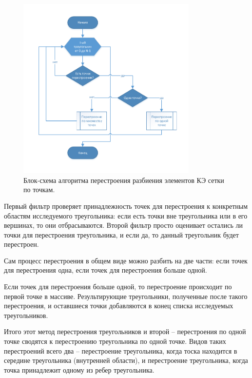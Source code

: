 \documentclass[
11pt,%
tightenlines,%
twoside,%
onecolumn,%
nofloats,%
nobibnotes,%
nofootinbib,%
superscriptaddress,%
noshowpacs,%
centertags]%
{revtex4}
\begin{document}
\begin{figure}[h]
\includegraphics[width=0.8\textwidth]{pics/pic_6.pdf}
\caption{Блок-схема алгоритма перестроения разбиения элементов КЭ сетки по точкам.}\label{fig:6}
\end{figure}

Первый фильтр проверяет принадлежность точек для перестроения к конкретным областям исследуемого треугольника: если есть точки вне треугольника или в его вершинах, то они отбрасываются.
Второй фильтр просто оценивает остались ли точки для перестроения треугольника, и если да, то данный треугольник будет перестроен.

Сам процесс перестроения в общем виде можно разбить на две части: если точек для перестроения одна, если точек для перестроения больше одной.

Если точек для перестроения больше одной, то перестроение происходит по первой точке в массиве. Результирующие треугольники, полученные после такого перестроения, и оставшиеся точки добавляются в конец списка исследуемых треугольников.

Итого этот метод перестроения треугольников и второй – перестроения по одной точке сводятся к перестроению треугольника по одной точке. Видов таких перестроений всего два – перестроение треугольника, когда тоска находится в середине треугольника (внутренней области), и перестроение треугольника, когда точка принадлежит одному из ребер треугольника.
\end{document}
